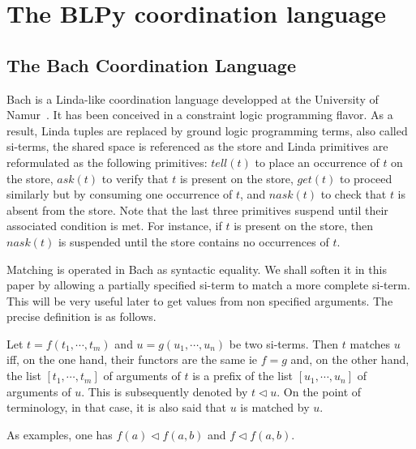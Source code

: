 \section{The BLPy coordination language}
\label{sect-BLPy}

\subsection{The Bach Coordination Language}

Bach is a Linda-like coordination language developped at the
University of Namur~\cite{jacquet2007coordinating}. It has been conceived in a
constraint logic programming flavor. As a result, Linda tuples are
replaced by ground logic programming terms, also called si-terms, the
shared space is referenced as the store and Linda primitives are
reformulated as the following primitives: $\mathit{tell(t)}$ to place an
occurrence of $t$ on the store, $\mathit{ask(t)}$ to verify that $t$
is present on the store, $\mathit{get(t)}$ to proceed similarly but by
consuming one occurrence of $t$, and $\mathit{nask(t)}$ to check that
$t$ is absent from the store. Note that the last three primitives
suspend until their associated condition is met. For instance, if $t$
is present on the store, then $\mathit{nask(t)}$ is suspended until
the store contains no occurrences of $t$.

Matching is operated in Bach as syntactic equality. We
shall soften it in this paper by allowing a partially specified
si-term to match a more complete si-term.  This will be very useful
later to get values from non specified arguments.  The precise
definition is as follows.

\begin{definition}
Let $t=f(t_1,\cdots,t_m)$ and $u=g(u_1, \cdots, u_n)$ be two
si-terms. Then $t$ matches $u$ iff, on the one hand, their functors
are the same ie $f=g$ and, on the other hand, the list
$[t_1,\cdots,t_m]$ of arguments of $t$ is a prefix of the list
$[u_1,\cdots,u_n]$ of arguments of $u$. This is subsequently denoted by
$t \triangleleft u$. On the point of terminology, in that case, it is also said that $u$ is matched by $u$.
\end{definition}

\begin{example}
As examples, one has $f(a) \triangleleft f(a,b)$ and
$f \triangleleft f(a,b)$.
\end{example}



